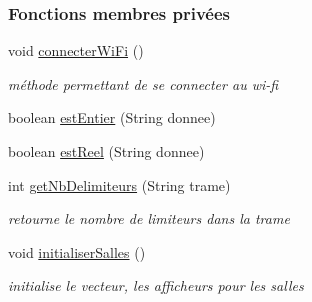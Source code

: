 \subsubsection*{Fonctions membres privées}
\begin{DoxyCompactItemize}
\item 
void \hyperlink{classcom_1_1lasalle_1_1meeting_1_1_main_activity_a8a28bbbc80b8806750b6297222f0bc92}{connecter\+Wi\+Fi} ()
\begin{DoxyCompactList}\small\item\em méthode permettant de se connecter au wi-\/fi \end{DoxyCompactList}\item 
boolean \hyperlink{classcom_1_1lasalle_1_1meeting_1_1_main_activity_a3841414e5b270c189de0d58bbd2aca57}{est\+Entier} (String donnee)
\item 
boolean \hyperlink{classcom_1_1lasalle_1_1meeting_1_1_main_activity_a8d0cd387540353465b1982157b20631c}{est\+Reel} (String donnee)
\item 
int \hyperlink{classcom_1_1lasalle_1_1meeting_1_1_main_activity_a0c5fe341f52a9db09401885878883663}{get\+Nb\+Delimiteurs} (String trame)
\begin{DoxyCompactList}\small\item\em retourne le nombre de limiteurs dans la trame \end{DoxyCompactList}\item 
void \hyperlink{classcom_1_1lasalle_1_1meeting_1_1_main_activity_a9be385d267f1d26e32c21d119bc65343}{initialiser\+Salles} ()
\begin{DoxyCompactList}\small\item\em initialise le vecteur, les afficheurs pour les salles \end{DoxyCompactList}\end{DoxyCompactItemize}

